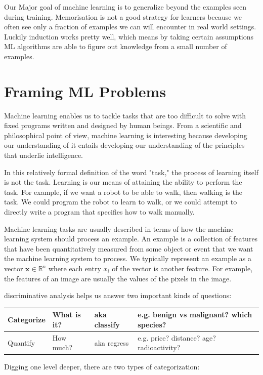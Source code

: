 \documentclass[openany]{book}
\begin{document}
Our Major goal of machine learning is to generalize beyond the examples seen during training. Memorisation is not a good strategy for learners because we often see only a fraction of examples we can will encounter in real world settings. Luckily induction works pretty well, which means by taking certain assumptions ML algorithms are able to figure out knowledge from a small number of examples.

\section{Framing ML Problems}

Machine learning enables us to tackle tasks that are too difficult to solve with fixed programs written and designed by human beings. From a scientific and philosophical point of view, machine learning is interesting because developing our understanding of it entails developing our understanding of the principles that underlie intelligence.

In this relatively formal definition of the word "task," the process of learning itself is not the task. Learning is our means of attaining the ability to perform the task. For example, if we want a robot to be able to walk, then walking is the task. We could program the robot to learn to walk, or we could attempt to directly write a program that specifies how to walk manually.

Machine learning tasks are usually described in terms of how the machine learning system should process an example. An example is a collection of features that have been quantitatively measured from some object or event that we want the machine learning system to process. We typically represent an example as a vector $\boldsymbol{x} \in \mathbb{R}^n$ where each entry $x_i$ of the vector is another feature. For example, the features of an image are usually the values of the pixels in the image.

 discriminative analysis helps us answer two important kinds of questions:
 
\begin{tabular}{|l|l|l|l|}
\hline Categorize & What is it? & aka classify & e.g. benign vs malignant? which species? \\
\hline Quantify & How much? & aka regress & e.g. price? distance? age? radioactivity? \\
\hline
\end{tabular}

Digging one level deeper, there are two types of categorization:
\end{document}
